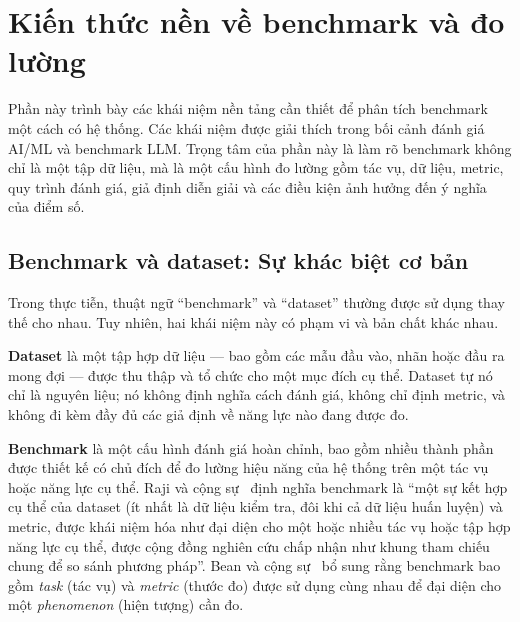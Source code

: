 
\section{Kiến thức nền về benchmark và đo lường}
\label{sec:foundations}

Phần này trình bày các khái niệm nền tảng cần thiết để phân tích benchmark một cách có hệ thống. Các khái niệm được giải thích trong bối cảnh đánh giá AI/ML và benchmark LLM. Trọng tâm của phần này là làm rõ benchmark không chỉ là một tập dữ liệu, mà là một cấu hình đo lường gồm tác vụ, dữ liệu, metric, quy trình đánh giá, giả định diễn giải và các điều kiện ảnh hưởng đến ý nghĩa của điểm số.

\subsection{Benchmark và dataset: Sự khác biệt cơ bản}
\label{sec:benchmark_vs_dataset}

Trong thực tiễn, thuật ngữ ``benchmark'' và ``dataset'' thường được sử dụng thay thế cho nhau. Tuy nhiên, hai khái niệm này có phạm vi và bản chất khác nhau.

\textbf{Dataset} là một tập hợp dữ liệu --- bao gồm các mẫu đầu vào, nhãn hoặc đầu ra mong đợi --- được thu thập và tổ chức cho một mục đích cụ thể. Dataset tự nó chỉ là nguyên liệu; nó không định nghĩa cách đánh giá, không chỉ định metric, và không đi kèm đầy đủ các giả định về năng lực nào đang được đo.

\textbf{Benchmark} là một cấu hình đánh giá hoàn chỉnh, bao gồm nhiều thành phần được thiết kế có chủ đích để đo lường hiệu năng của hệ thống trên một tác vụ hoặc năng lực cụ thể. Raji và cộng sự~\cite{everything_benchmark} định nghĩa benchmark là ``một sự kết hợp cụ thể của dataset (ít nhất là dữ liệu kiểm tra, đôi khi cả dữ liệu huấn luyện) và metric, được khái niệm hóa như đại diện cho một hoặc nhiều tác vụ hoặc tập hợp năng lực cụ thể, được cộng đồng nghiên cứu chấp nhận như khung tham chiếu chung để so sánh phương pháp''. Bean và cộng sự~\cite{measuring_what_matters} bổ sung rằng benchmark bao gồm \textit{task} (tác vụ) và \textit{metric} (thước đo) được sử dụng cùng nhau để đại diện cho một \textit{phenomenon} (hiện tượng) cần đo.

